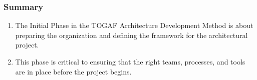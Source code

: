 \documentclass[aspectratio=169, table]{beamer}
\begin{document}
\begin{frame}
    \frametitle{Summary}
        \begin{enumerate}
        \item The Initial Phase in the TOGAF Architecture Development Method is about preparing the organization and defining the framework for the architectural project.
        \item This phase is critical to ensuring that the right teams, processes, and tools are in place before the project begins.
    \end{enumerate}
\end{frame}
\end{document}
